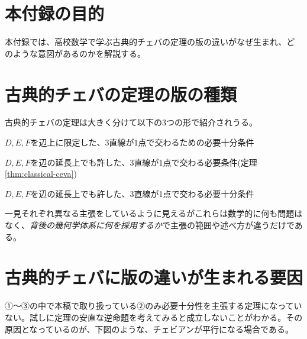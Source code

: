 \documentclass[a4paper,12pt]{bxjsbook}
\newlength{\customindent}
\newenvironment{body}{
  \par
  \begingroup
  \setlength{\leftskip}{\customindent}
  \setlength{\rightskip}{0pt}
  \setlength{\parindent}{1em}
  \setlength{\displayindent}{\customindent}
  \setlength{\displaywidth}{\dimexpr\linewidth-\customindent\relax}
}{
  \par
  \endgroup
}
\theoremstyle{theorem}
\begin{document}
    \section{本付録の目的}
    \begin{body}
        \indent 本付録では、高校数学で学ぶ古典的チェバの定理の版の違いがなぜ生まれ、どのような意図があるのかを解説する。
    \end{body}

    \section{古典的チェバの定理の版の種類}
    \begin{body}
        \indent 古典的チェバの定理は大きく分けて以下の3つの形で紹介されうる。
        \begin{bodyitemize}
            \item[①] $D, E, F$を辺上に限定した、3直線が1点で交わるための必要十分条件
            \item[②] $D, E, F$を辺の延長上でも許した、3直線が1点で交わる必要条件(定理\ref{thm:classical-ceva})
            \item[③] $D, E, F$を辺の延長上でも許した、3直線が1点で交わる必要十分条件
        \end{bodyitemize}

        \indent 一見それぞれ異なる主張をしているように見えるがこれらは数学的に何も問題はなく、\emph{背後の幾何学体系に何を採用するか}で主張の範囲や述べ方が違うだけである。

    \end{body}

    \section{古典的チェバに版の違いが生まれる要因}
    \begin{body}
        \indent ①〜③の中で本稿で取り扱っている②のみ必要十分性を主張する定理になっていない。試しに定理の安直な逆命題を考えてみると成立しないことがわかる。その原因となっているのが、下図のような、チェビアンが平行になる場合である。
    \end{body}
\end{document}
